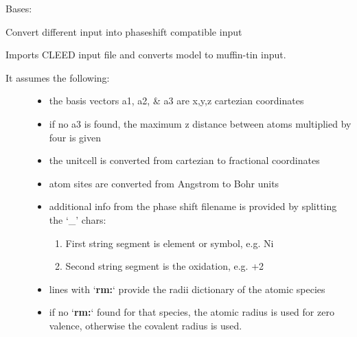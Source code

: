 \documentclass[letterpaper,10pt,english]{sphinxmanual}
\begin{document}

\begin{fulllineitems}
\label{modules:phaseshifts.leed.Converter}
Bases: 

Convert different input into phaseshift compatible input

\begin{fulllineitems}
\label{modules:phaseshifts.leed.Converter.import_CLEED}
Imports CLEED input file and converts model to muffin-tin input.
\begin{description}
\item[{It assumes the following:}] \leavevmode\begin{itemize}
\item {} 
the basis vectors a1, a2, \& a3 are x,y,z cartezian coordinates

\item {} 
if no a3 is found, the maximum z distance between atoms multiplied
by four is given

\item {} 
the unitcell is converted from cartezian to fractional coordinates

\item {} 
atom sites are converted from Angstrom to Bohr units

\item {} 
additional info from the phase shift filename is provided by 
splitting the `\_' chars:
\begin{enumerate}
\item {} 
First string segment is element or symbol, e.g. Ni

\item {} 
Second string segment is the oxidation, e.g. +2

\end{enumerate}

\item {} 
lines with `\textbf{rm:}` provide the radii dictionary of the atomic 
species

\item {} 
if no `\textbf{rm:}` found for that species, the atomic radius is used 
for zero valence, otherwise the covalent radius is used.

\end{itemize}


\end{description}
\end{fulllineitems}
\end{fulllineitems}
\end{document}
